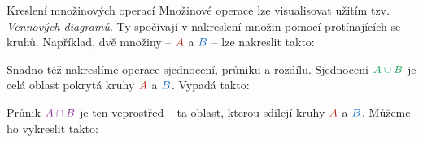 \documentclass[final]{beamer}
\newlength{\colwidth}
\newcommand{\clr}{\textcolor{BrickRed}}
\newcommand{\clb}{\textcolor{RoyalBlue}}
\newcommand{\clg}{\textcolor{ForestGreen}}
\newcommand{\clm}{\textcolor{Fuchsia}}
\begin{document}
\begin{frame}[t]
\begin{columns}[t]
    \begin{column}{\colwidth}
      \begin{block}{Kreslení množinových operací}
        Množinové operace lze visualisovat užitím tzv. \emph{Vennových
        diagramů}. Ty spočívají v nakreslení množin pomocí protínajících se
        kruhů. Například, dvě množiny -- $\clr{A}$ a $\clb{B}$ -- lze nakreslit
        takto:
        \begin{center}
        \end{center}
        Snadno též nakreslíme operace sjednocení, průniku a rozdílu. Sjednocení
        $\clg{A \cup B}$ je celá oblast pokrytá kruhy $\clr{A}$ a $\clb{B}$.
        Vypadá takto:
        \begin{center}
        \end{center}
        Průnik $\clm{A \cap B}$ je ten  veprostřed -- ta oblast,
        kterou sdílejí kruhy $\clr{A}$ a $\clb{B}$. Můžeme ho vykreslit takto:
        \begin{center}
\end{center}
\end{block}
\end{column}
\end{columns}
\end{frame}
\end{document}
